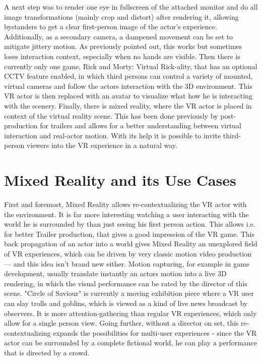 A next step was to render one eye in fullscreen of the attached monitor and do 
all image transformations (mainly crop and distort) after rendering it, 
allowing bystanders to get a clear first-person image of the actor's 
experience. Additionally, as a secondary camera, a dampened movement can be set 
to mitigate jittery motion. As previously pointed out, this works but sometimes 
loses interaction context, especially when no hands are visible. 
\newline
Then there is currently only one game, Rick and Morty: Virtual Rick-ality, that 
has an optional CCTV feature enabled, in which third persons can control a 
variety of mounted, virtual cameras and follow the actors interaction with the 
3D environment. This VR actor is then replaced with an avatar to visualize what 
how he is interacting with the scenery.
\newline
Finally, there is mixed reality, where the VR actor is placed in context of 
the virtual reality scene. This has been done previously by post-production for 
trailers and allows for a better understanding between virtual interaction and 
real-actor motion. With its help it is possible to invite third-person viewers 
into the VR experience in a natural way.

\section{Mixed Reality and its Use Cases}

First and foremost, Mixed Reality allows re-contextualizing the VR actor with 
the environment. It is far more interesting watching a user interacting with 
the world he is surrounded by than just seeing his first person action. This 
allows i.e. for better Trailer production, that gives a good impression of the 
VR game.
\newline
This back propagation of an actor into a world gives Mixed Reality an 
unexplored field of VR experiences, which can be driven by very classic motion 
video production --- and this idea isn't brand new either. Motion capturing, 
for example in game development, usually translate instantly an actors motion 
into a live 3D rendering, in which the visual performance can be rated by the 
director of this scene.
\newline
"Circle of Saviour" is currently a moving exhibition piece where a VR user can 
slay trolls and goblins, which is viewed as a kind of live news broadcast by 
observers. It is more attention-gathering than regular VR experiences, which 
only allow for a single person view. 
\newline
Going further, without a director on set, this re-contextualizing expands the 
possibilities for multi-user experiences - since the VR actor can be surrounded 
by a complete fictional world, he can play a performance that is directed by a 
crowd.

